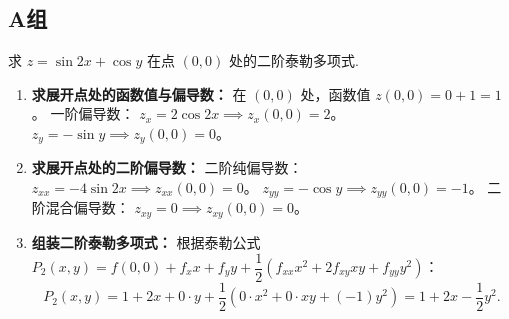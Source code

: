 \documentclass[lang=cn,11pt]{elegantbook}
\begin{document}
\subsection{A组}

\begin{exercise}
求 $z = \sin2x + \cos y$ 在点 $(0,0)$ 处的二阶泰勒多项式.
\end{exercise}
\begin{solution}
\begin{enumerate}
  \item \textbf{求展开点处的函数值与偏导数：}
  在 $(0,0)$ 处，函数值 $z(0,0) = 0 + 1 = 1$。
  一阶偏导数：
  $z_x = 2\cos 2x \implies z_x(0,0) = 2$。
  $z_y = -\sin y \implies z_y(0,0) = 0$。
  
  \item \textbf{求展开点处的二阶偏导数：}
  二阶纯偏导数：
  $z_{xx} = -4\sin 2x \implies z_{xx}(0,0) = 0$。
  $z_{yy} = -\cos y \implies z_{yy}(0,0) = -1$。
  二阶混合偏导数：
  $z_{xy} = 0 \implies z_{xy}(0,0) = 0$。
  
  \item \textbf{组装二阶泰勒多项式：}
  根据泰勒公式 $P_2(x,y) = f(0,0) + f_x x + f_y y + \dfrac{1}{2}(f_{xx}x^2 + 2f_{xy}xy + f_{yy}y^2)$：
  \[
  P_2(x,y) = 1 + 2x + 0\cdot y + \frac{1}{2}\left( 0\cdot x^2 + 0\cdot xy + (-1)y^2 \right) = 1 + 2x - \frac{1}{2}y^2.
  \]
\end{enumerate}
\end{solution}
\end{document}
